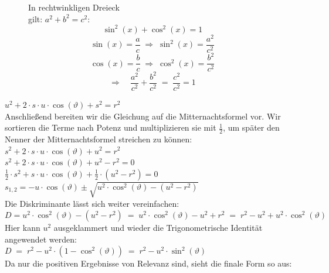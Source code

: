 \begin{figure}
	\vspace{-8pt} %
	\begin{minipage}{0.39\textwidth}
		\begin{tcolorbox}[
			title={Trig. Identität\textcolor{white}{\parencite{handbuch_nawi_trig}}}, %
			fonttitle=\bfseries\footnotesize,   
			fontupper=\footnotesize,            
			colback=white,
			colframe=gray!60!black,
			fonttitle=\bfseries,
			boxrule=0.4pt
			]
			In rechtwinkligen Dreieck \\gilt: $a^2+b^2=c^2$:
			\[
			\sin^2(x) + \cos^2(x) = 1
			\]
			\[
			\sin(x) = \frac{a}{c} \; \Rightarrow \; \sin^2(x) = \frac{a^2}{c^2}
			\]
			\[
			\cos(x) = \frac{b}{c} \; \Rightarrow \; \cos^2(x) = \frac{b^2}{c^2}
			\]
			\[
			\Longrightarrow\quad \frac{a^2}{c^2} + \frac{b^2}{c^2} \; = \; \frac{c^2}{c^2} = 1
			\]
		\end{tcolorbox}
	\end{minipage}
	\vspace{-6pt}
\end{figure}
$\displaystyle u^2+2\cdot s\cdot u\cdot \cos(\vartheta)+s^2 =r^2$\\
Anschließend bereiten wir die Gleichung auf die Mitternachtsformel vor. Wir sortieren die Terme nach Potenz und multiplizieren sie mit $\tfrac{1}{2}$, um später den Nenner der Mitternachtsformel streichen zu können:\\
$\displaystyle s^2+2\cdot s\cdot u\cdot \cos(\vartheta)+u^2 =r^2$\\
$\displaystyle s^2+2\cdot s\cdot u\cdot \cos(\vartheta)+u^2-r^2=0$\\
$\displaystyle \frac{1}{2}\cdot s^2+s\cdot u\cdot \cos(\vartheta)+\frac{1}{2}\cdot (u^2-r^2)=0$\\
$\displaystyle s_{1,2}=-u\cdot \cos(\vartheta)\pm\sqrt{u^2\cdot \cos^2(\vartheta)-(u^2-r^2)}$\\
Die Diskriminante lässt sich weiter vereinfachen:\\
$\displaystyle D=u^2\cdot \cos^2(\vartheta)-(u^2-r^2)\;=\;u^2\cdot \cos^2(\vartheta)-u^2+r^2\;=\;r^2-u^2 + u^2 \cdot \cos^2(\vartheta)$\\
Hier kann $u^2$ ausgeklammert und wieder die Trigonometrische Identität angewendet werden:\\
$D\;=\; r^2-u^2 \cdot (1-\cos^2(\vartheta))\; = \; r^2 - u^2 \cdot \sin^2(\vartheta)$
\\
Da nur die positiven Ergebnisse von Relevanz sind, sieht die finale Form so aus:
